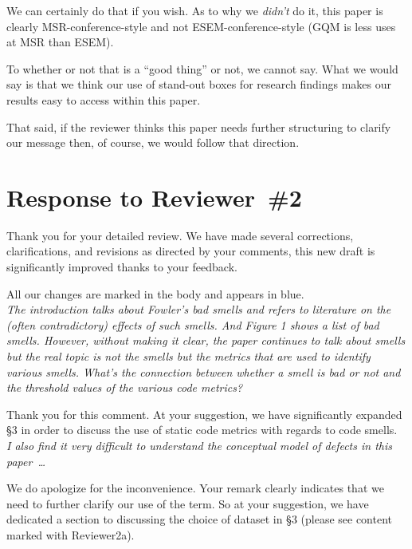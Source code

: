 \documentclass[twocolumn,5p]{elsarticle}
\newcommand{\tion}[1]{\S#1}
\newcommand{\review}[1]{\noindent\textit{#1\\}}
\theoremstyle{break}
\begin{document}
We can certainly do that if you wish. As to why we {\em didn't} do it,
this paper is clearly MSR-conference-style and not
ESEM-conference-style (GQM is less uses at MSR than ESEM).

To whether or not that is a ``good thing'' or not, we cannot say. What
we would say is that we think our use of stand-out boxes for research
findings makes our results easy to access within this paper.

That said, if the reviewer thinks this paper needs further structuring
to clarify our message then, of course, we would follow that direction.


\section*{Response to Reviewer~\#2}

Thank you for your detailed review. We have made several 
corrections, clarifications, and revisions as directed by your comments, 
this new draft is significantly improved thanks to your feedback. 

\noindent All our 
changes are marked in the body and appears in 
{\color{steel} blue}.\\

\review{The introduction talks about Fowler’s bad smells and 
	refers to 
	literature on the (often contradictory) effects of such smells. And Figure 
	1 shows a list of bad smells. However, without making it clear, the paper 
	continues to talk about smells but the real topic is not the smells but the 
	metrics that are used to identify various smells. What’s the connection 
	between whether a smell is bad or not and the threshold values of the 
	various code metrics?}

Thank you for this comment. At your suggestion, we have significantly 
expanded \tion{3} in order to discuss the use of static code metrics 
with regards to code smells.\\

\review{I also find it very difficult to understand the conceptual model of 
	defects in this paper~\ldots}

We do apologize for the inconvenience.
Your remark clearly indicates that we need to further clarify our use
of the term.
So at your suggestion, we have 
dedicated a section to discussing the choice of dataset in \tion{3} 
(please see content marked with 
{\color{steel} Reviewer2a}).\\
\end{document}
